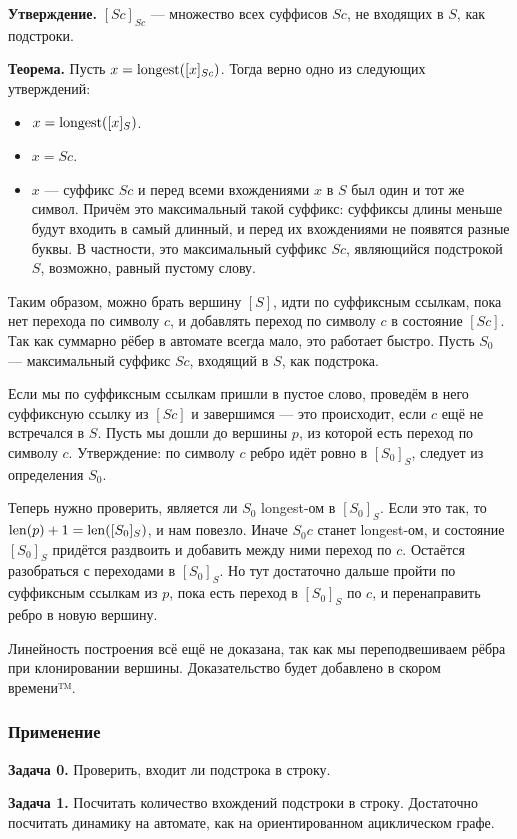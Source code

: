 \textbf{Утверждение.} $[Sc]_{Sc}$ --- множество всех суффисов $Sc$, не входящих в $S$, как подстроки.

\textbf{Теорема.} Пусть $x = \operatorname{longest}([x]_{Sc})$. Тогда верно одно из следующих утверждений:
\begin{itemize}
    \item $x = \operatorname{longest}([x]_S)$.
    \item $x = Sc$.
    \item $x$ --- суффикс $Sc$ и перед всеми вхождениями $x$ в $S$ был один и тот же символ.
        Причём это максимальный такой суффикс: суффиксы длины меньше будут входить в самый длинный, и перед их вхождениями не появятся разные буквы.
        В частности, это максимальный суффикс $Sc$, являющийся подстрокой $S$, возможно, равный пустому слову.
\end{itemize}

Таким образом, можно брать вершину $[S]$, идти по суффиксным ссылкам, пока нет перехода по символу $c$, и добавлять переход по символу $c$ в состояние $[Sc]$.
Так как суммарно рёбер в автомате всегда мало, это работает быстро.
Пусть $S_0$ --- максимальный суффикс $Sc$, входящий в $S$, как подстрока.

Если мы по суффиксным ссылкам пришли в пустое слово, проведём в него суффиксную ссылку из $[Sc]$ и завершимся --- это происходит, если $c$ ещё не встречался в $S$.
Пусть мы дошли до вершины $p$, из которой есть переход по символу $c$.
Утверждение: по символу $c$ ребро идёт ровно в $[S_0]_S$, следует из определения $S_0$.

Теперь нужно проверить, является ли $S_0$ longest-ом в $[S_0]_S$.
Если это так, то $\operatorname{len}(p) + 1 = \operatorname{len}([S_0]_S)$, и нам повезло.
Иначе $S_0c$ станет longest-ом, и состояние $[S_0]_S$ придётся раздвоить и добавить между ними переход по $c$.
Остаётся разобраться с переходами в $[S_0]_S$. Но тут достаточно дальше пройти по суффиксным ссылкам из $p$, пока есть переход в $[S_0]_S$ по $c$, и перенаправить ребро в новую вершину.

Линейность построения всё ещё не доказана, так как мы переподвешиваем рёбра при клонировании вершины.
Доказательство будет добавлено в скором времени™.

\subsubsection{Применение}
\textbf{Задача 0.} Проверить, входит ли подстрока в строку.

\textbf{Задача 1.} Посчитать количество вхождений подстроки в строку.
Достаточно посчитать динамику на автомате, как на ориентированном ациклическом графе.

